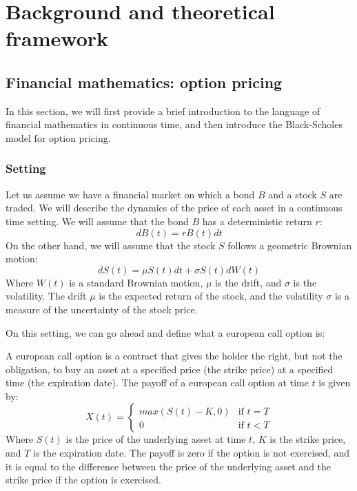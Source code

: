 \chapter{Background and theoretical framework}
\label{ch:background}

\section{Financial mathematics: option pricing}
\label{sec:financial_background}
In this section, we will first provide a brief introduction to the language of financial mathematics in continuous time, and then introduce the Black-Scholes model for option pricing.

\subsection{Setting}
Let us assume we have a financial market on which a bond $B$ and a stock $S$ are traded. We will describe the dynamics of the price of each asset in a continuous time setting. We will assume that the bond $B$ has a deterministic return $r$:
\begin{equation}
    \label{eq:bond}
    dB(t) = r B(t) dt
\end{equation}
On the other hand, we will assume that the stock $S$ follows a geometric Brownian motion:
\begin{equation}
    \label{eq:stock}
    dS(t) = \mu S(t) dt + \sigma S(t) dW(t)
\end{equation}
Where $W(t)$ is a standard Brownian motion, $\mu$ is the drift, and $\sigma$ is the volatility. The drift $\mu$ is the expected return of the stock, and the volatility $\sigma$ is a measure of the uncertainty of the stock price.

On this setting, we can go ahead and define what a european call option is:
\begin{definition}
    A european call option is a contract that gives the holder the right, but not the obligation, to buy an asset at a specified price (the strike price) at a specified time (the expiration date). The payoff of a european call option at time $t$ is given by:
    \begin{equation}
        X(t) = \begin{cases}
            max(S(t)-K,0) & \text{if } t = T\\
            0 & \text{if } t < T
        \end{cases}
    \end{equation}
    Where $S(t)$ is the price of the underlying asset at time $t$, $K$ is the strike price, and $T$ is the expiration date. The payoff is zero if the option is not exercised, and it is equal to the difference between the price of the underlying asset and the strike price if the option is exercised.
\end{definition}

